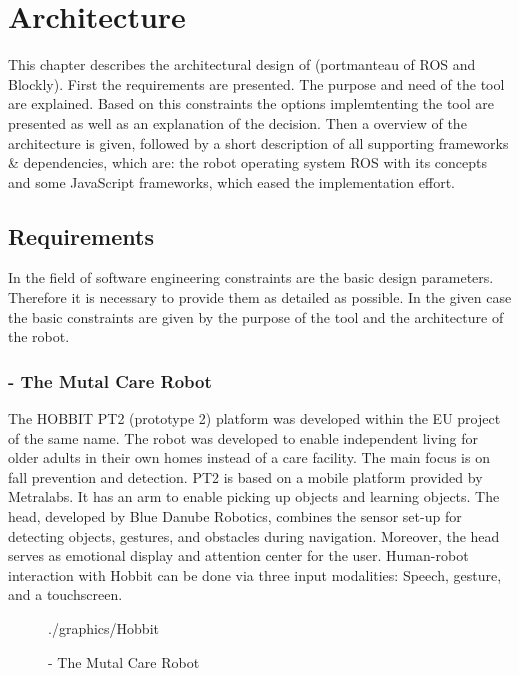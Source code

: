 \chapter{Architecture}
This chapter describes the architectural design of \toolname{} (portmanteau of ROS and Blockly). First the requirements are presented. The purpose and need of the tool are explained. Based on this constraints the options implemtenting the tool are presented as well as an explanation of the decision. Then a overview of the architecture is given, followed by a short description of all supporting frameworks & dependencies, which are: the robot operating system ROS with its concepts and some JavaScript frameworks, which eased the implementation effort.

\section{Requirements} \label{sec:requirements}
In the field of software engineering constraints are the basic design parameters. Therefore it is necessary to provide them as detailed as possible. In the given case the basic constraints are given by the purpose of the tool and the architecture of the robot.

\subsection{\hobbit{} - The Mutal Care Robot}
The HOBBIT PT2 (prototype 2) platform was developed within the EU project of the same name. The robot was developed to enable independent living for older adults in their own homes instead of a care facility. The main focus is on fall prevention and detection. PT2 is based on a mobile platform provided by Metralabs. It has an arm to enable picking up objects and learning objects. The head, developed by Blue Danube Robotics, combines the sensor set-up for detecting objects, gestures, and obstacles during navigation. Moreover, the head serves as emotional display and attention center for the user. Human-robot interaction with Hobbit can be done via three input modalities: Speech, gesture, and a touchscreen. \cite{HobbitACIN}\\

\begin{figure}[htbp]
	\centering
	\begin{overpic}[width=0.3\linewidth]{./graphics/Hobbit}
	\end{overpic}
	\caption{\hobbit{} - The Mutal Care Robot}%
	\label{fig:HobbitPic}%
\end{figure}

